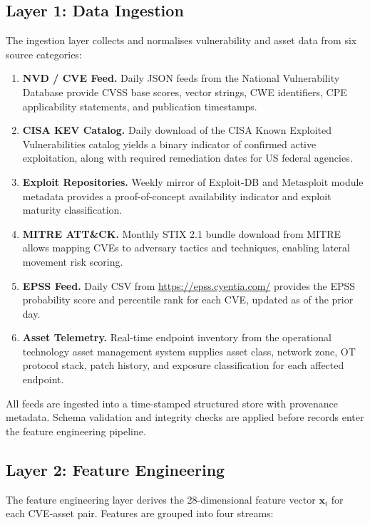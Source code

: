 \documentclass[review,12pt]{elsarticle}
\begin{document}
\subsection{Layer 1: Data Ingestion}

The ingestion layer collects and normalises vulnerability and asset data from six source categories:

\begin{enumerate}[label=(\roman*)]
  \item \textbf{NVD / CVE Feed.} Daily JSON feeds from the National Vulnerability Database \citep{nvd} provide CVSS base scores, vector strings, CWE identifiers, CPE applicability statements, and publication timestamps.
  \item \textbf{CISA KEV Catalog.} Daily download of the CISA Known Exploited Vulnerabilities catalog \citep{cisa_kev} yields a binary indicator of confirmed active exploitation, along with required remediation dates for US federal agencies.
  \item \textbf{Exploit Repositories.} Weekly mirror of Exploit-DB \citep{exploitdb} and Metasploit module metadata provides a proof-of-concept availability indicator and exploit maturity classification.
  \item \textbf{MITRE ATT\&CK.} Monthly STIX 2.1 bundle download from MITRE \citep{mitre_attack} allows mapping CVEs to adversary tactics and techniques, enabling lateral movement risk scoring.
  \item \textbf{EPSS Feed.} Daily CSV from \url{https://epss.cyentia.com/} \citep{jacobs2023} provides the EPSS probability score and percentile rank for each CVE, updated as of the prior day.
  \item \textbf{Asset Telemetry.} Real-time endpoint inventory from the operational technology asset management system supplies asset class, network zone, OT protocol stack, patch history, and exposure classification for each affected endpoint.
\end{enumerate}

All feeds are ingested into a time-stamped structured store with provenance metadata. Schema validation and integrity checks are applied before records enter the feature engineering pipeline.

\subsection{Layer 2: Feature Engineering}

The feature engineering layer derives the 28-dimensional feature vector $\mathbf{x}_i$ for each CVE-asset pair. Features are grouped into four streams:
\end{document}
